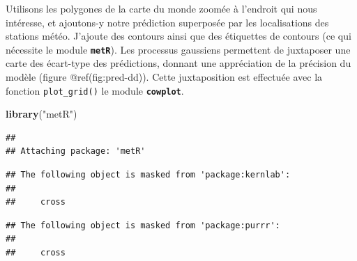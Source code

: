 \documentclass[]{book}
\newenvironment{Shaded}{\begin{snugshade}}{\end{snugshade}}
\newcommand{\KeywordTok}[1]{\textcolor[rgb]{0.13,0.29,0.53}{\textbf{#1}}}
\newcommand{\NormalTok}[1]{#1}
\newcommand{\StringTok}[1]{\textcolor[rgb]{0.31,0.60,0.02}{#1}}
\begin{document}
Utilisons les polygones de la carte du monde zoomée à l'endroit qui nous
intéresse, et ajoutons-y notre prédiction superposée par les
localisations des stations météo. J'ajoute des contours ainsi que des
étiquettes de contours (ce qui nécessite le module
\textbf{\texttt{metR}}). Les processus gaussiens permettent de
juxtaposer une carte des écart-type des prédictions, donnant une
appréciation de la précision du modèle (figure @ref(fig:pred-dd)). Cette
juxtaposition est effectuée avec la fonction \texttt{plot\_grid()} le
module \textbf{\texttt{cowplot}}.

\begin{Shaded}
\begin{Highlighting}[]
\KeywordTok{library}\NormalTok{(}\StringTok{"metR"}\NormalTok{)}
\end{Highlighting}
\end{Shaded}

\begin{verbatim}
## 
## Attaching package: 'metR'
\end{verbatim}

\begin{verbatim}
## The following object is masked from 'package:kernlab':
## 
##     cross
\end{verbatim}

\begin{verbatim}
## The following object is masked from 'package:purrr':
## 
##     cross
\end{verbatim}
\end{document}
